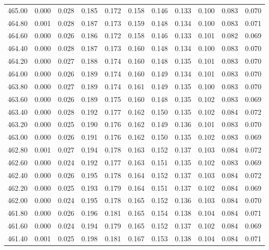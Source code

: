 \begin{longtable}{cccccccccc}
    465.00 &  0.000 &  0.028 &  0.185 &  0.172 &  0.158 &  0.146 &  0.133 &  0.100 &  0.083 &  0.070 \\
    464.80 &  0.001 &  0.028 &  0.187 &  0.173 &  0.159 &  0.148 &  0.134 &  0.100 &  0.083 &  0.071 \\
    464.60 &  0.000 &  0.026 &  0.186 &  0.172 &  0.158 &  0.146 &  0.133 &  0.101 &  0.082 &  0.069 \\
    464.40 &  0.000 &  0.028 &  0.187 &  0.173 &  0.160 &  0.148 &  0.134 &  0.100 &  0.083 &  0.070 \\
    464.20 &  0.000 &  0.027 &  0.188 &  0.174 &  0.160 &  0.148 &  0.135 &  0.101 &  0.083 &  0.070 \\
    464.00 &  0.000 &  0.026 &  0.189 &  0.174 &  0.160 &  0.149 &  0.134 &  0.101 &  0.083 &  0.070 \\
    463.80 &  0.000 &  0.027 &  0.189 &  0.174 &  0.161 &  0.149 &  0.135 &  0.100 &  0.083 &  0.070 \\
    463.60 &  0.000 &  0.026 &  0.189 &  0.175 &  0.160 &  0.148 &  0.135 &  0.102 &  0.083 &  0.069 \\
    463.40 &  0.000 &  0.028 &  0.192 &  0.177 &  0.162 &  0.150 &  0.135 &  0.102 &  0.084 &  0.072 \\
    463.20 &  0.000 &  0.025 &  0.190 &  0.176 &  0.162 &  0.149 &  0.136 &  0.101 &  0.083 &  0.070 \\
    463.00 &  0.000 &  0.026 &  0.191 &  0.176 &  0.162 &  0.150 &  0.135 &  0.102 &  0.083 &  0.069 \\
    462.80 &  0.001 &  0.027 &  0.194 &  0.178 &  0.163 &  0.152 &  0.137 &  0.103 &  0.084 &  0.072 \\
    462.60 &  0.000 &  0.024 &  0.192 &  0.177 &  0.163 &  0.151 &  0.135 &  0.102 &  0.083 &  0.069 \\
    462.40 &  0.000 &  0.026 &  0.195 &  0.178 &  0.164 &  0.152 &  0.137 &  0.103 &  0.084 &  0.072 \\
    462.20 &  0.000 &  0.025 &  0.193 &  0.179 &  0.164 &  0.151 &  0.137 &  0.102 &  0.084 &  0.069 \\
    462.00 &  0.000 &  0.024 &  0.195 &  0.178 &  0.165 &  0.152 &  0.136 &  0.103 &  0.084 &  0.070 \\
    461.80 &  0.000 &  0.026 &  0.196 &  0.181 &  0.165 &  0.154 &  0.138 &  0.104 &  0.084 &  0.071 \\
    461.60 &  0.000 &  0.024 &  0.194 &  0.179 &  0.165 &  0.152 &  0.137 &  0.102 &  0.084 &  0.069 \\
    461.40 &  0.001 &  0.025 &  0.198 &  0.181 &  0.167 &  0.153 &  0.138 &  0.104 &  0.084 &  0.071 \\

\end{longtable}
